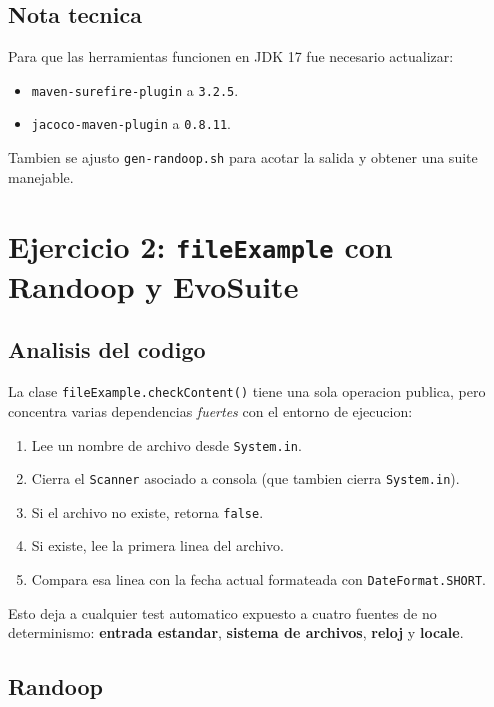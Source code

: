 \documentclass[12pt,a4paper]{article}
\begin{document}
\subsection{Nota tecnica}

Para que las herramientas funcionen en JDK 17 fue necesario actualizar:

\begin{itemize}
  \item \texttt{maven-surefire-plugin} a \texttt{3.2.5}.
  \item \texttt{jacoco-maven-plugin} a \texttt{0.8.11}.
\end{itemize}

Tambien se ajusto \texttt{gen-randoop.sh} para acotar la salida y obtener una suite manejable.

\section{Ejercicio 2: \texttt{fileExample} con Randoop y EvoSuite}

\subsection{Analisis del codigo}

La clase \texttt{fileExample.checkContent()} tiene una sola operacion publica, pero concentra
varias dependencias \emph{fuertes} con el entorno de ejecucion:

\begin{enumerate}
  \item Lee un nombre de archivo desde \texttt{System.in}.
  \item Cierra el \texttt{Scanner} asociado a consola (que tambien cierra \texttt{System.in}).
  \item Si el archivo no existe, retorna \texttt{false}.
  \item Si existe, lee la primera linea del archivo.
  \item Compara esa linea con la fecha actual formateada con \texttt{DateFormat.SHORT}.
\end{enumerate}

Esto deja a cualquier test automatico expuesto a cuatro fuentes de no determinismo:
\textbf{entrada estandar}, \textbf{sistema de archivos}, \textbf{reloj} y \textbf{locale}.

\subsection{Randoop}
\end{document}
